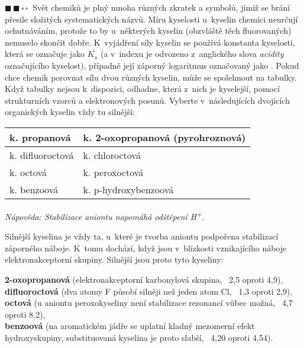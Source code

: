 \documentclass{book}
\newcommand{\dva}{$\blacksquare \, \blacksquare \, \square \, \square \; \; $}
\renewenvironment{quotation}{\par}{\par} %
\begin{document}
\hrulefill %
\begin{quotation}
\dva Svět chemiků je plný mnoha různých zkratek a symbolů, jimiž se brání
přesile složitých systematických názvů. Míru kyselosti u~kyselin chemici
neurčují ochutnáváním, protože to by u~některých kyselin (obzvláště
těch fluorovaných) nemuselo skončit dobře. K~vyjádření síly kyselin
se používá konstanta kyselosti, která se označuje jako $K_\mathrm{a}$ (a v~indexu je odvozeno z~anglického slova \textit{acidity} označujícího kyselost),
případně její záporný logaritmus označovaný jako \pKa.
Pokud chce chemik porovnat sílu dvou různých kyselin, může se spolehnout
na tabulky. Když tabulky nejsou k~dispozici, odhadne, která z~nich
je kyselejší, pomocí strukturních vzorců a elektronových posunů. Vyberte
v~následujících dvojicích organických kyselin vždy tu silnější: 
\end{quotation} \dotfill \par 
\begin{center}
\centering
\begin{tabular}[h!]{l|l}

k. propanová & k. 2-oxopropanová (pyrohroznová)\tabularnewline
\hline 
k. difluoroctová & k. chloroctová\tabularnewline
\hline 
k. octová & k. peroxoctová\tabularnewline
\hline 
k. benzoová & k. p-hydroxybenzoová\tabularnewline
\end{tabular}
\end{center}
\begin{quotation}
\noindent\textit{Nápověda: Stabilizace aniontu napomáhá odštěpení H}\textsuperscript{\textit{+}}\textit{.}
\end{quotation} \dotfill \par 

Silnější kyselina je vždy ta, u~které je tvorba aniontu podpořena
stabilizací záporného náboje. K~tomu dochází, když jsou v~blízkosti vznikajícího náboje elektronakceptorní skupiny. Silnější jsou proto tyto kyseliny:

\textbf{2-oxopropanová} (elektronakceptorní karbonylová skupina, \pKa\ 2,5 oproti 4,9),\\
\textbf{difluoroctová} (dva atomy F působí silněji než jeden
atom Cl, \pKa\ 1,3 oproti 2,9),\\ 
\textbf{octová} (u
aniontu peroxokyseliny není stabilizace rezonancí vůbec možná, \pKa\ 4,7 oproti 8,2),\\ 
\textbf{benzoová} (na aromatickém jádře se uplatní kladný
mezomerní efekt hydroxyskupiny, substituovaná kyselina je proto slabší, \pKa\ 4,20 oproti 4,54).
\end{document}
